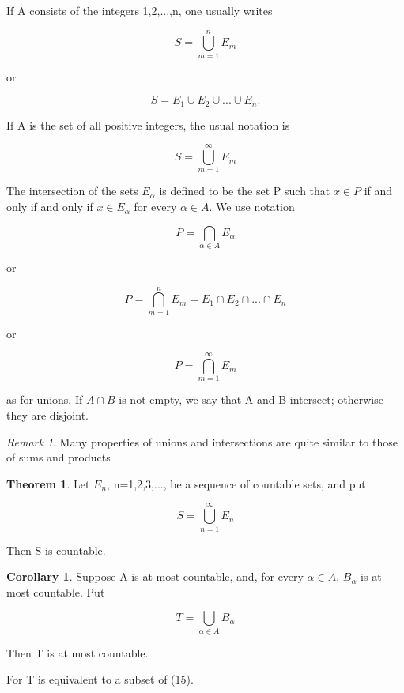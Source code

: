 \documentclass{article}
\theoremstyle{definition}
\newtheorem{theo}{Theorem}
\newtheorem{coro}{Corollary}
\theoremstyle{remark}
\newtheorem{Rem}{Remark}
\begin{document}
	If A consists of the integers 1,2,...,n, one usually writes
	
	\begin{equation}
		S=\bigcup_{m=1}^nE_m
	\end{equation}
	
	or
	
	\begin{equation}
		S=E_1\cup E_2\cup ...\cup E_n.
	\end{equation}
	
	If A is the set of all positive integers, the usual notation is 
	
	\begin{equation}
		S=\bigcup_{m=1}^\infty E_m
	\end{equation}

	The intersection of the sets $E_\alpha$ is defined to be the set P such that $x\in P$ if and only if and only if $x\in E_\alpha$ for every $\alpha \in A.$ We use notation
	
	\begin{equation}
		P=\bigcap_{\alpha\in A} E_\alpha
	\end{equation}

	or 
	
	\begin{equation}
		P=\bigcap_{m=1}^n E_m=E_1\cap E_2\cap...\cap E_n
	\end{equation}
	
	or
	
	\begin{equation}
		P=\bigcap_{m=1}^\infty E_m
	\end{equation}
	
	as for unions. If $A\cap B$ is not empty, we say that A and B intersect; otherwise they are disjoint.
	
	\begin{Rem}
		Many properties of unions and intersections are quite similar to those of sums and products
	\end{Rem}
	
	\begin{theo}
		Let ${E_n}$, n=1,2,3,..., be a sequence of countable sets, and put 
		
		\begin{equation}
			S=\bigcup_{n=1}^\infty E_n
		\end{equation}
		
		Then S is countable.
	\end{theo}
	
	\begin{coro}
		Suppose A is at most countable, and, for every $\alpha\in A$, $B_\alpha$ is at most countable. Put
		
		\begin{equation}
			T=\bigcup_{\alpha\in A}B_\alpha
		\end{equation}
		
		Then T is at most countable.
				
	\end{coro}
		For T is equivalent to a subset of (15).
		
\end{document}
